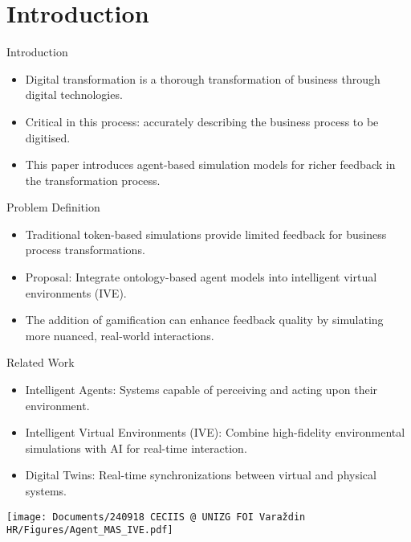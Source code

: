 \section{Introduction}

\begin{frame}{Introduction}
    \begin{itemize}
        \item \alert{Digital transformation} is a thorough transformation of business through digital technologies.
        \item Critical in this process: accurately describing the business process to be digitised.
        \item This paper introduces agent-based simulation models for richer feedback in the transformation process.
    \end{itemize}
\end{frame}

\begin{frame}{Problem Definition}
    \begin{itemize}
        \item Traditional token-based simulations provide limited feedback for business process transformations.
        \item Proposal: Integrate ontology-based agent models into intelligent virtual environments (IVE).
        \item The addition of gamification can enhance feedback quality by simulating more nuanced, real-world interactions.
    \end{itemize}
\end{frame}

\begin{frame}{Related Work}
    \begin{multicols}{2}
        \begin{itemize}
            \item \alert{Intelligent Agents}: Systems capable of perceiving and acting upon their environment.
            \item \alert{Intelligent Virtual Environments (IVE)}: Combine high-fidelity environmental simulations with AI for real-time interaction.
            \item \alert{Digital Twins}: Real-time synchronizations between virtual and physical systems.
        \end{itemize}

        \columnbreak

        \centering
        \texttt{[image: Documents/240918 CECIIS @ UNIZG FOI Varaždin HR/Figures/Agent\_MAS\_IVE.pdf]}
    \end{multicols}
\end{frame}

